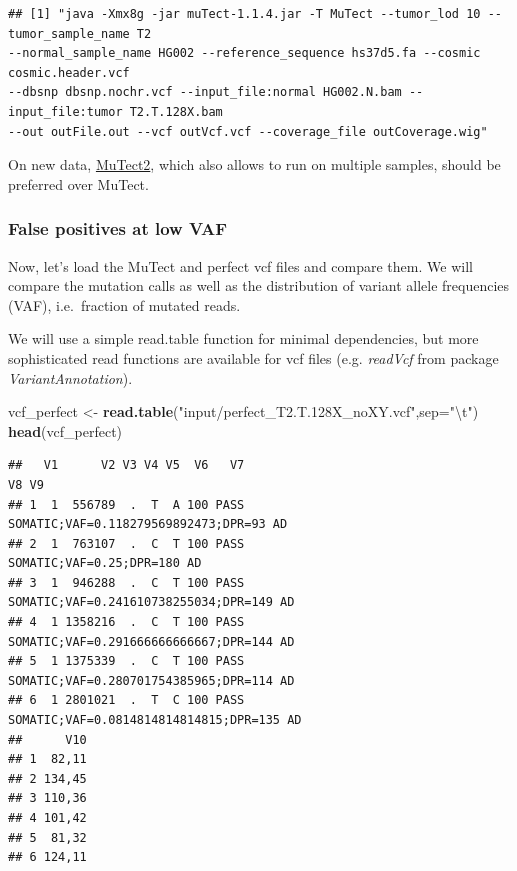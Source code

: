 \documentclass[]{article}
\newenvironment{Shaded}{\begin{snugshade}}{\end{snugshade}}
\newcommand{\CharTok}[1]{\textcolor[rgb]{0.31,0.60,0.02}{#1}}
\newcommand{\DataTypeTok}[1]{\textcolor[rgb]{0.13,0.29,0.53}{#1}}
\newcommand{\KeywordTok}[1]{\textcolor[rgb]{0.13,0.29,0.53}{\textbf{#1}}}
\newcommand{\NormalTok}[1]{#1}
\newcommand{\StringTok}[1]{\textcolor[rgb]{0.31,0.60,0.02}{#1}}
\begin{document}
\begin{verbatim}
## [1] "java -Xmx8g -jar muTect-1.1.4.jar -T MuTect --tumor_lod 10 --tumor_sample_name T2
--normal_sample_name HG002 --reference_sequence hs37d5.fa --cosmic cosmic.header.vcf
--dbsnp dbsnp.nochr.vcf --input_file:normal HG002.N.bam --input_file:tumor T2.T.128X.bam
--out outFile.out --vcf outVcf.vcf --coverage_file outCoverage.wig"
\end{verbatim}

On new data,
\href{https://gatk.broadinstitute.org/hc/en-us/articles/360037593851-Mutect2}{MuTect2},
which also allows to run on multiple samples, should be preferred over
MuTect.

\hypertarget{false-positives-at-low-vaf}{%
\subsubsection{False positives at low
VAF}\label{false-positives-at-low-vaf}}

Now, let's load the MuTect and perfect vcf files and compare them. We
will compare the mutation calls as well as the distribution of variant
allele frequencies (VAF), i.e.~fraction of mutated reads.

We will use a simple read.table function for minimal dependencies, but
more sophisticated read functions are available for vcf files (e.g.
\emph{readVcf} from package \emph{VariantAnnotation}).

\begin{Shaded}
\begin{Highlighting}[]
\NormalTok{vcf_perfect <-}\StringTok{ }\KeywordTok{read.table}\NormalTok{(}\StringTok{"input/perfect_T2.T.128X_noXY.vcf"}\NormalTok{,}\DataTypeTok{sep=}\StringTok{"}\CharTok{\textbackslash{}t}\StringTok{"}\NormalTok{)}
\KeywordTok{head}\NormalTok{(vcf_perfect)}
\end{Highlighting}
\end{Shaded}

\begin{verbatim}
##   V1      V2 V3 V4 V5  V6   V7                                     V8 V9
## 1  1  556789  .  T  A 100 PASS   SOMATIC;VAF=0.118279569892473;DPR=93 AD
## 2  1  763107  .  C  T 100 PASS               SOMATIC;VAF=0.25;DPR=180 AD
## 3  1  946288  .  C  T 100 PASS  SOMATIC;VAF=0.241610738255034;DPR=149 AD
## 4  1 1358216  .  C  T 100 PASS  SOMATIC;VAF=0.291666666666667;DPR=144 AD
## 5  1 1375339  .  C  T 100 PASS  SOMATIC;VAF=0.280701754385965;DPR=114 AD
## 6  1 2801021  .  T  C 100 PASS SOMATIC;VAF=0.0814814814814815;DPR=135 AD
##      V10
## 1  82,11
## 2 134,45
## 3 110,36
## 4 101,42
## 5  81,32
## 6 124,11
\end{verbatim}
\end{document}
